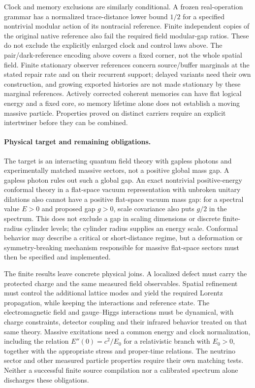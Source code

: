 Clock and memory exclusions are similarly conditional. A frozen
real-operation grammar has a normalized trace-distance lower bound
$1/2$ for a specified nontrivial modular action of its nontracial
reference. Finite independent copies of the original native reference
also fail the required field modular-gap ratios. These do not exclude
the explicitly enlarged clock and control laws above. The
pair/dark-reference encoding above covers a fixed corner, not the whole spatial
field. Finite stationary observer references concern source/buffer
marginals at the stated repair rate and on their recurrent support;
delayed variants need their own construction, and growing exported
histories are not made stationary by these marginal references. Actively
corrected coherent memories can have flat logical energy and a fixed
core, so memory lifetime alone does not establish a moving massive
particle. Properties proved on distinct carriers require an explicit
intertwiner before they can be combined.

\paragraph{Physical target and remaining obligations.}
The target is an interacting quantum field theory with gapless photons
and experimentally matched massive sectors, not a positive global mass
gap. A gapless photon rules out such a global gap. An exact
nontrivial positive-energy conformal theory in a flat-space vacuum
representation with unbroken unitary dilations also cannot have a
positive flat-space vacuum mass gap: for a spectral value
$E>0$ and proposed gap $g>0$, scale covariance also puts $g/2$ in the
spectrum. This does not exclude a gap in scaling dimensions or discrete
finite-radius cylinder levels; the cylinder radius supplies an energy
scale. Conformal behavior may describe a critical or short-distance
regime, but a deformation or symmetry-breaking mechanism responsible for
massive flat-space sectors must then be specified and implemented.

The finite results leave concrete physical joins. A localized defect must
carry the protected charge and the same measured field observables.
Spatial refinement must control the additional lattice modes and yield
the required Lorentz propagation, while keeping the interactions and
reference state. The electromagnetic field and gauge--Higgs interactions
must be dynamical, with charge constraints, detector coupling and their
infrared behavior treated on that same theory. Massive excitations need
a common energy and clock normalization, including the relation
$E''(0)=c^2/E_0$ for a relativistic branch with $E_0>0$, together with the
appropriate stress and proper-time relations. The neutrino sector and
other measured particle properties require their own matching tests.
Neither a successful finite source compilation nor a calibrated spectrum
alone discharges these obligations.
